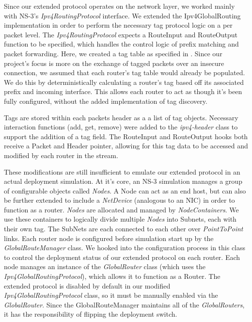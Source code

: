 \documentclass[12pt]{article} %
\begin{document}
Since our extended protocol operates on the network layer, we worked mainly with NS-3's {\it Ipv4RoutingProtocol} interface. We extended the Ipv4GlobalRouting implementation in order to perform the necessary tag protocol logic on a per packet level. The {\it Ipv4RoutingProtocol} expects a RouteInput and RouteOutput function to be specified, which handles the control logic of prefix matching and packet forwarding. Here, we created a tag table as specified in \cite{Shue20081567}. Since our project's focus is more on the exchange of tagged packets over an insecure connection, we assumed that each router's tag table would already be populated. We do this by deterministically calculating a router's tag based off its associated prefix and incoming interface. This allows each router to act as though it's been fully configured, without the added implementation of tag discovery. 

Tags are stored within each packets header as a a list of tag objects. Necessary interaction functions (add, get, remove) were added to the {\it ipv4-header} class to support the addition of a tag field. The RouteInput and RouteOutput hooks both receive a Packet and Header pointer, allowing for this tag data to be accessed and modified by each router in the stream. 

These modifications are still insufficient to emulate our extended protocol in an actual deployment simulation. At it's core, an NS-3 simulation manages a group of configurable objects called {\it Nodes}. A Node can act as an end host, but can also be further extended to include a {\it NetDevice} (analogous to an NIC) in order to function as a router. {\it Nodes} are allocated and managed by {\it NodeContainers}. We use these containers to logically divide multiple {\it Nodes} into Subnets, each with their own tag. The SubNets are each connected to each other over {\it PointToPoint} links. Each router node is configured before simulation start up by the {\it GlobalRouteManager} class. We hooked into the configuration process in this class to control the deployment status of our extended protocol on each router. Each node manages an instance of the {\it GlobalRouter} class (which uses the {\it Ipv4GlobalRoutingProtocol}), which allows it to function as a Router. The extended protocol is disabled by default in our modified {\it Ipv4GlobalRoutingProtocol} class, so it must be manually enabled via the {\it GlobalRouter}. Since the GlobalRouteManager maintains all of the {\it GlobalRouters}, it has the responsibility of flipping the deployment switch.
\end{document}
